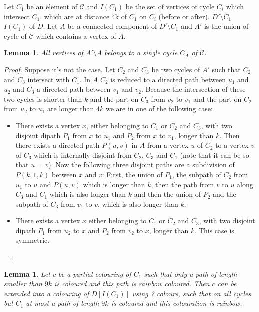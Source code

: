 \documentclass[10pt]{article}
\theoremstyle{plain}
\newtheorem{lemma}[theorem]{Lemma}
\theoremstyle{definition}
\theoremstyle{remark}
\begin{document}
Let $C_1$ be an element of $\mathcal{C}$ and $I(C_1)$ be the set of vertices of cycle $C_i$ which intersect $C_1$, which are at distance 4k 
of $C_1$ on $C_i$ (before or after).  $D'\setminus C_1$ $I(C_1)$ of $D$. Let $A$ be a connected component 
of $D'\setminus C_1$ and $A'$ is the union of cycle of $\mathcal{C}$ which contains a vertex of $A$. 


\begin{lemma}
All vertices of $A' \setminus A$ belongs to a single cycle $C_A$ of $\mathcal{C}$.
\end{lemma}

\begin{proof}

Suppose it's not the case. Let $C_2$ and $C_3$ be two cycles of $A'$ such that $C_2$ and $C_3$ intersect with $C_1$. 
In $A$ $C_2$ is reduced to a directed path between $u_1$ and $u_2$ and $C_3$ a directed path between $v_1$ and $v_2$.
Because the intersection of these two cycles is shorter than $k$ and the part on $C_3$ from $v_2$ to $v_1$ and the part
on $C_2$ from $u_2$ to $u_1$ are longer than $4k$ we are in one of the following case:
\begin{itemize}
	\item There exists a vertex $x$, either belonging to $C_1$ or $C_2$ and $C_3$, with two disjoint dipath $P_1$ from
	$x$ to $u_1$ and $P_2$ from $x$ to $v_1$, longer than $k$. Then there exists a directed path $P(u,v)$ in $A$ from 
	a vertex $u$ of $C_2$ to a vertex $v$ of $C_3$ which is internally disjoint from  $C_2$, $C_3$ and $C_1$ 
	(note that it can be so that $u$ = $v$). Now the following three disjoint paths are a subdivision of $P(k,1,k)$ between $x$ and $v$:
	First, the union of $P_1$, the subpath of $C_2$ from $u_1$ to $u$ and $P(u,v)$ which is longer than $k$, then the path from $v$ to $u$ 
	along $C_3$ and $C_1$ which is also longer than $k$ and then the union of $P_2$ and the subpath of $C_3$ from $v_1$ to $v$, which is also longer than $k$.
	\item There exists a vertex $x$ either belonging to $C_1$ or $C_2$ and $C_3$, with two disjoint dipath $P_1$ from
	$u_2$ to $x$ and $P_2$ from $v_2$ to $x$, longer than $k$. This case is symmetric. 
\end{itemize}

\end{proof}

\begin{lemma}
Let $c$ be a partial colouring of $C_1$ such that only a path of length smaller than
$9k$ is coloured and this path is rainbow coloured. Then $c$ can be extended into
a colouring of $D[I(C_1)]$ using ? colours, such that on all cycles but $C_1$ at most a path of length $9k$ is
coloured and this colouration is rainbow.
\end{lemma}
\end{document}
